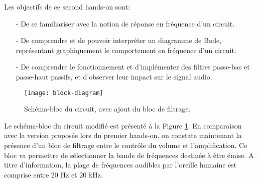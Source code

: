 Les objectifs de ce second hands-on sont:
\begin{itemize}
	\item[-] De se familiariser avec la notion de réponse en fréquence d'un circuit.
	\item[-] De comprendre et de pouvoir interpréter un diagramme de Bode, représentant graphiquement le comportement en fréquence d'un circuit.
	\item[-] De comprendre le fonctionnement et d'implémenter des filtres passe-bas et passe-haut passifs, et d'observer leur impact sur le signal audio.
\end{itemize}
\vspace{.25cm}

\begin{figure} [!ht]
	\centering
	\texttt{[image: block-diagram]}
	\caption{Schéma-bloc du circuit, avec ajout du bloc de filtrage.}
	\label{fig1:block-diagram}
\end{figure}

Le schéma-bloc du circuit modifié est présenté à la Figure \ref{fig1:block-diagram}. En comparaison avec la version proposée lors du premier hands-on, on constate maintenant la présence d'un bloc de filtrage entre le contrôle du volume et l'amplification. Ce bloc va permettre de sélectionner la bande de fréquences destinée à être émise. A titre d'information, la plage de fréquences audibles par l'oreille humaine est comprise entre 20 Hz et 20 kHz.